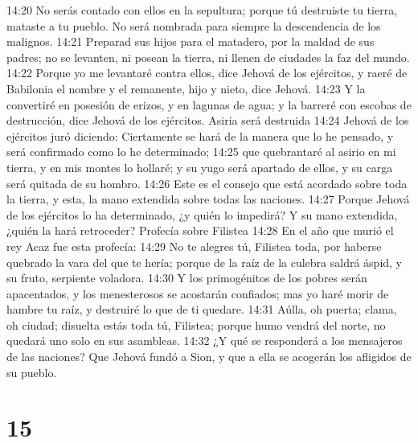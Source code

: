 14:20 No serás contado con ellos en la sepultura; porque tú destruiste tu tierra, mataste a tu pueblo. No será nombrada para siempre la descendencia de los malignos.  
14:21 Preparad sus hijos para el matadero, por la maldad de sus padres; no se levanten, ni posean la tierra, ni llenen de ciudades la faz del mundo.  
14:22 Porque yo me levantaré contra ellos, dice Jehová de los ejércitos, y raeré de Babilonia el nombre y el remanente, hijo y nieto, dice Jehová.  
14:23 Y la convertiré en posesión de erizos, y en lagunas de agua; y la barreré con escobas de destrucción, dice Jehová de los ejércitos. 
Asiria será destruida  
14:24 Jehová de los ejércitos juró diciendo: Ciertamente se hará de la manera que lo he pensado, y será confirmado como lo he determinado;  
14:25 que quebrantaré al asirio en mi tierra, y en mis montes lo hollaré; y su yugo será apartado de ellos, y su carga será quitada de su hombro.  
14:26 Este es el consejo que está acordado sobre toda la tierra, y esta, la mano extendida sobre todas las naciones.  
14:27 Porque Jehová de los ejércitos lo ha determinado, ¿y quién lo impedirá? Y su mano extendida, ¿quién la hará retroceder?  
Profecía sobre Filistea  
14:28 En el año que murió el rey Acaz fue esta profecía:  
14:29 No te alegres tú, Filistea toda, por haberse quebrado la vara del que te hería; porque de la raíz de la culebra saldrá áspid, y su fruto, serpiente voladora.  
14:30 Y los primogénitos de los pobres serán apacentados, y los menesterosos se acostarán confiados; mas yo haré morir de hambre tu raíz, y destruiré lo que de ti quedare.  
14:31 Aúlla, oh puerta; clama, oh ciudad; disuelta estás toda tú, Filistea; porque humo vendrá del norte, no quedará uno solo en sus asambleas.  
14:32 ¿Y qué se responderá a los mensajeros de las naciones? Que Jehová fundó a Sion, y que a ella se acogerán los afligidos de su pueblo.  

\chapter{15}

